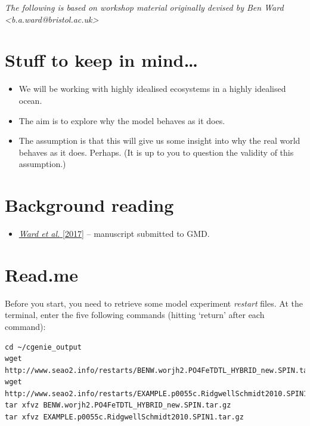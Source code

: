 \documentclass[11pt,fleqn]{book} %
\begin{document}
\hfill \break

\noindent \textit{The following is based on workshop material originally devised by Ben Ward <b.a.ward@bristol.ac.uk>}

\section*{Stuff to keep in mind\dots}
\begin{itemize}
\item We will be working with highly idealised ecosystems in a highly idealised ocean.
\item The aim is to explore why the model behaves as it does.
\item The assumption is that this will give us some insight into why the real world behaves as it does. Perhaps. (It is up to you to question the validity of this assumption.)
\end{itemize}

\section*{Background reading}
\begin{itemize}
\item \href{http://www.seao2.info/pubs/EcoGEnIE.pdf}{\textit{Ward et al.} [2017]} -- manuscript submitted to GMD.
\end{itemize}


\newpage


\section*{Read.me}

Before you start, you need to retrieve some model experiment \textit{restart} files. At the terminal, enter the five following commands (hitting `return' after each command):

\vspace{-2mm}
\small\begin{verbatim}
cd ~/cgenie_output
wget http://www.seao2.info/restarts/BENW.worjh2.PO4FeTDTL_HYBRID_new.SPIN.tar.gz
wget http://www.seao2.info/restarts/EXAMPLE.p0055c.RidgwellSchmidt2010.SPIN1.tar.gz
tar xfvz BENW.worjh2.PO4FeTDTL_HYBRID_new.SPIN.tar.gz
tar xfvz EXAMPLE.p0055c.RidgwellSchmidt2010.SPIN1.tar.gz
\end{verbatim}\normalsize
\vspace{-2mm}
\end{document}
